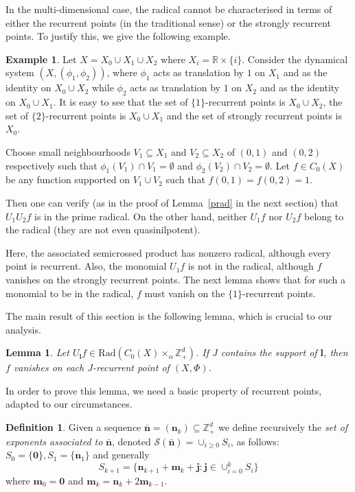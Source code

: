 \documentclass[12pt]{amsart}
\newtheorem{lemma}[theorem]{Lemma}
\theoremstyle{definition}
\newtheorem{definition}[theorem]{Definition}
\newtheorem{example}[theorem]{Example}
\newcommand{\mcS}{\mathcal{S}}
\newcommand{\bbR}{\mathbb{R}}
\newcommand{\bbZ}{\mathbb{Z}}
\newcommand{\rad}{\mathrm{Rad}}
\newcommand{\bo}[1]{\mathbf{#1}}
\newcommand{\bom}{\mathbf{m}}
\newcommand{\bon}{\mathbf{n}}
\begin{document}
In the multi-dimensional case, the radical cannot be characterised
in terms of either the recurrent points (in the traditional sense)
or the strongly recurrent points.
To justify this, we give the following example.

\begin{example}
Let $X=X_0 \cup X_1 \cup X_2$ where $X_i = \bbR \times \{i\}$.
Consider the dynamical system $(X,(\phi_1,\phi_2))$,
where $\phi_1$ acts as translation by $1$ on $X_1$ and as
the identity on $X_0 \cup X_2$ while $\phi_2$ acts as translation
by $1$ on $X_2$ and as the identity on $X_0 \cup X_1$.
It is easy to see that the set of $\{1\}$-recurrent points is $X_0 \cup X_2$,
the set of $\{2\}$-recurrent points is $X_0 \cup X_1$ and the set of
strongly recurrent points is $X_0$.

Choose small neighbourhoods $V_1 \subseteq X_1$ and $V_2 \subseteq X_2$
of $(0,1)$ and $(0,2)$ respectively such that
$\phi_1(V_1)\cap V_1=\emptyset$ and $\phi_2(V_2)\cap V_2=\emptyset$.
Let $f\in C_{0}(X)$ be any function supported on
$V_1\cup V_2$ such that $f(0,1)=f(0,2)=1$.

Then one can verify (as in the proof of Lemma~\ref{prad} in the next
section) that $U_1U_2 f$ is in the prime radical.
On the other hand, neither $U_1 f$ nor $U_2 f$ belong to the radical
(they are not even quasinilpotent).

Here, the associated semicrossed product has nonzero radical, although
every point is recurrent.
Also, the monomial $U_1 f$ is not in the radical, although $f$ vanishes on
the strongly recurrent points.
The next lemma shows that for such a monomial to be in the radical,
$f$ must vanish on the $\{1\}$-recurrent points.
\end{example}

The main result of this section is the following lemma,
which is crucial to our analysis.

\begin{lemma}
\label{rad} Let
$U_{\bo{l}}f \in\rad(C_0(X)\times_\alpha \bbZ_+^d)$.
If $J$ contains the support of $\bo{l}$, then $f$ vanishes
on each $J$-recurrent point of $(X,\Phi)$.
\end{lemma}

In order to prove this lemma, we need a basic property of
recurrent points, adapted to our circumstances.
\medskip

\begin{definition}
Given a sequence $\bar{\bon}=(\bon_{k})\subseteq\bbZ_+^d$
we define recursively the \emph{set of exponents associated to}
$\bar{\bon}$, denoted $\mcS(\bar{\bon})=\cup_{i\geq0}S_i$,
as follows: $S_0=\{\bo{0}\},S_1=\{\bon_1\}$ and generally
\[
S_{k+1}=\{\bon_{k+1}+\bom_k+\bo{j}:
    \bo{j}\in\cup_{i=0}^{k}S_i\}
\]
where $\bom_0=\bo{0}$ and $\bom_k=\bon_k+2\bom_{k-1}$.
\end{definition}
\end{document}
